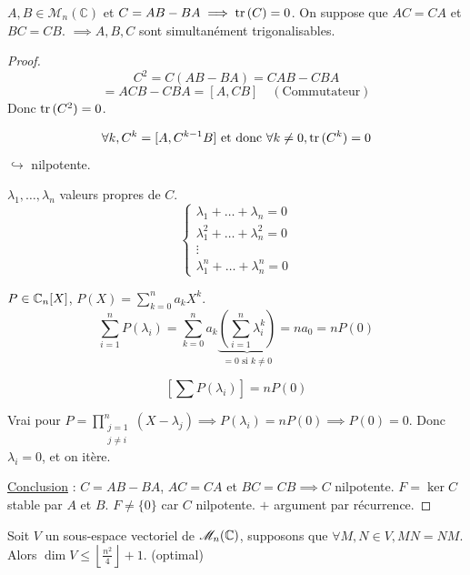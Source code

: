  $A, B \in \mathcal{M}_n(\mathbb{C})$ et $C = AB - BA \implies \operatorname{tr} \,(C) = 0$.
On suppose que $AC = CA$ et $BC = CB$.
$\implies A, B, C$ sont simultanément trigonalisables.

\begin{proof}
    \[ C^2 = C(AB - BA) = CAB - CBA \]
    \[ = ACB - CBA = [A, CB] \quad (\text{Commutateur}) \]
    Donc $\operatorname{tr} \,(C^2) = 0$.
    
    \[ \forall k, C^k = [A, C^{k-1}B] \text{ et donc } \forall k \neq 0, \operatorname{tr} \,(C^k) = 0 \]
    $\hookrightarrow$ nilpotente.
    
    \lvspace
    $\lambda_1, \dots, \lambda_n$ valeurs propres de $C$.
    \[
        \begin{cases}
            \lambda_1 + \dots + \lambda_n = 0 \\
            \lambda_1^2 + \dots + \lambda_n^2 = 0 \\
            \vdots \\
            \lambda_1^n + \dots + \lambda_n^n = 0
        \end{cases}
    \]
    
    $P \in \mathbb{C}_n[X]$, $P(X) = \sum_{k=0}^n a_k X^k$.
    \[ \sum_{i=1}^n P(\lambda_i) = \sum_{k=0}^n a_k \underbrace{\left( \sum_{i=1}^n \lambda_i^k \right)}_{=0 \text{ si } k \neq 0} = n a_0 = n P(0) \]
    
    \[ \left[ \sum P(\lambda_i) \right] = n P(0) \]
    
    Vrai pour $P = \prod_{\substack{j=1 \\ j \neq i}}^n (X - \lambda_j) \implies P(\lambda_i) = n P(0) \implies P(0) = 0$.
    Donc $\lambda_i = 0$, et on itère.
    
    \lvspace
    \uline{Conclusion} : $C = AB - BA$, $AC = CA$ et $BC = CB \implies C$ nilpotente.
    $F = \ker C$ stable par $A$ et $B$.
    $F \neq \{0\}$ car $C$ nilpotente.
    $+$ argument par récurrence.
\end{proof}

 Soit $V$ un sous-espace vectoriel de $\mathscr M_n(\mathbb{C})$,
supposons que $\forall M, N \in V, MN = NM$.
Alors $\dim V \leqslant \left\lfloor \frac{n^2}{4} \right\rfloor + 1$. (optimal)

